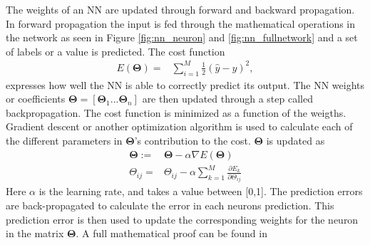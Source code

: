         The weights of an NN are updated through forward and backward propagation. In forward propagation the input is fed through the mathematical operations in the network as seen in Figure \ref{fig:nn_neuron} and \ref{fig:nn_fullnetwork} and a set of labels or a value is predicted. The cost function 
        \begin{align}
            E(\bm\Theta) = &\sum_{i=1}^M\frac{1}{2}(\hat{y} - y)^2 \nonumber,
            \label{nn:cost}
        \end{align}
        expresses how well the NN is able to correctly predict its output. The NN weights or coefficients $\bm \Theta = [\bm \Theta_1 ... \bm \Theta_n]$ are then updated through a step called backpropagation. The cost function is minimized as a function of the weigths. Gradient descent or another optimization algorithm is used to calculate each of the different parameters in $\bm \Theta$'s contribution to the cost. $\bm \Theta$ is updated as 
        \begin{align}
            \bm \Theta := & \bm \Theta - \alpha \nabla E(\bm \Theta) \nonumber \\
            \Theta_{ij} = & \Theta_{ij} - \alpha \sum_{k=1}^M \frac{\partial E_k}{\partial \Theta_{ij}} 
            \label{bp:1}
        \end{align}
        Here $\alpha$ is the learning rate, and takes a value between [0,1]. The prediction errors are back-propagated to calculate the error in each neurons prediction. This prediction error is then used to update the corresponding weights for the neuron in the matrix $\bm \Theta$. A full mathematical proof can be found in \cite{Aasnes2017}
        
        
